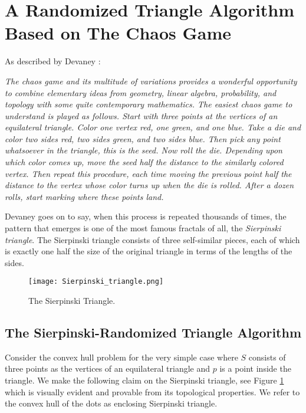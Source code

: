 \documentclass{article}
\theoremstyle{definition}
\begin{document}
\section{A Randomized Triangle Algorithm Based on The Chaos Game} \label{sec4}

As described by Devaney \cite{Devaney2004}:

{\it The {\it chaos game} and its multitude of variations provides a wonderful opportunity to combine elementary ideas from geometry, linear algebra, probability, and topology with some quite contemporary mathematics. The easiest chaos game to understand is played as follows. Start with three points at the vertices of an equilateral triangle. Color one vertex red, one green, and one blue. Take a die and color two sides red, two sides green, and two sides blue. Then pick any point whatsoever in the triangle, this is the seed. Now roll the die. Depending upon which color comes up, move the seed half the distance to the similarly colored vertex. Then repeat this procedure, each time moving the previous point half the distance to the vertex whose color turns up when the die is rolled. After a dozen rolls, start marking where these points land.}

Devaney goes on to say, when this process is  repeated  thousands of times, the pattern that emerges is one of the most famous fractals of all, the {\it Sierpinski triangle}. The Sierpinski triangle consists of three self-similar pieces, each of which is exactly one half the size of the original triangle in terms of the lengths of the sides.

\begin{figure}[h!]
\centering
\texttt{[image: Sierpinski\_triangle.png]}
\caption{The Sierpinski Triangle.} \label{Sier}
\end{figure}


\subsection{The Sierpinski-Randomized Triangle Algorithm}

Consider the convex hull problem for the very simple case where $S$ consists of three points as the vertices of an equilateral triangle and $p$ is a point inside the triangle.  We make the following claim on the Sierpinski triangle, see  Figure \ref{Sier} which is visually evident and provable from its topological properties. We  refer to the convex hull of the dots as enclosing Sierpinski triangle.\\
\end{document}
